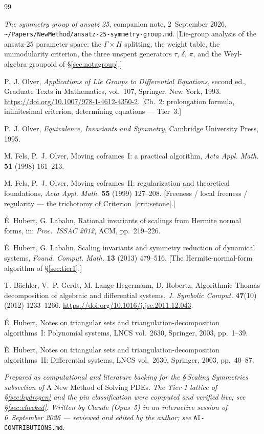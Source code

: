 \documentclass[11pt]{article}
\newcommand{\code}[1]{\texttt{#1}}
\theoremstyle{plain}
\theoremstyle{definition}
\theoremstyle{remark}
\begin{document}
\begin{thebibliography}{99}

\emph{The symmetry group of ansatz 25}, companion note, 2~September 2026,
\nolinkurl{~/Papers/NewMethod/ansatz-25-symmetry-group.md}. [Lie-group analysis
of the ansatz-25 parameter space: the $\Gamma \times H$ splitting, the weight
table, the unimodularity criterion, the three unspent generators $\tau$,
$\delta$, $\pi$, and the Weyl-algebra groupoid of \S\ref{sec:notagroup}.]

P.~J. Olver, \emph{Applications of Lie Groups to Differential Equations}, second
ed., Graduate Texts in Mathematics, vol.~107, Springer, New York, 1993.
\url{https://doi.org/10.1007/978-1-4612-4350-2}. [Ch.~2: prolongation formula,
infinitesimal criterion, determining equations --- Tier~3.]

P.~J. Olver, \emph{Equivalence, Invariants and Symmetry}, Cambridge University
Press, 1995.

M. Fels, P.~J. Olver, Moving coframes~I: a practical algorithm, \emph{Acta Appl.
Math.} \textbf{51} (1998) 161--213.

M. Fels, P.~J. Olver, Moving coframes~II: regularization and theoretical
foundations, \emph{Acta Appl. Math.} \textbf{55} (1999) 127--208.
[Freeness / local freeness / regularity --- the trichotomy of
Criterion~\ref{crit:setone}.]

\'E. Hubert, G. Labahn, Rational invariants of scalings from Hermite normal
forms, in: \emph{Proc.\ ISSAC 2012}, ACM, pp.~219--226.

\'E. Hubert, G. Labahn, Scaling invariants and symmetry reduction of dynamical
systems, \emph{Found. Comput. Math.} \textbf{13} (2013) 479--516.
[The Hermite-normal-form algorithm of \S\ref{sec:tier1}.]

T. B\"achler, V.~P. Gerdt, M. Lange-Hegermann, D. Robertz, Algorithmic Thomas
decomposition of algebraic and differential systems, \emph{J. Symbolic Comput.}
\textbf{47}(10) (2012) 1233--1266.
\url{https://doi.org/10.1016/j.jsc.2011.12.043}.

\'E. Hubert, Notes on triangular sets and triangulation-decomposition
algorithms~I: Polynomial systems, LNCS vol.~2630, Springer, 2003, pp.~1--39.

\'E. Hubert, Notes on triangular sets and triangulation-decomposition
algorithms~II: Differential systems, LNCS vol.~2630, Springer, 2003,
pp.~40--87.

\end{thebibliography}

\bigskip
\noindent\emph{Prepared as computational and literature backing for the
\S\,Scaling Symmetries subsection of} A New Method of Solving PDEs. \emph{The
Tier-1 lattice of \S\ref{sec:hydrogen} and the pin classification were computed
and verified live; see \S\ref{sec:checked}. Written by Claude (Opus~5) in an
interactive session of 6~September 2026 --- reviewed and edited by the author;
see} \code{AI-CONTRIBUTIONS.md}.
\end{document}
